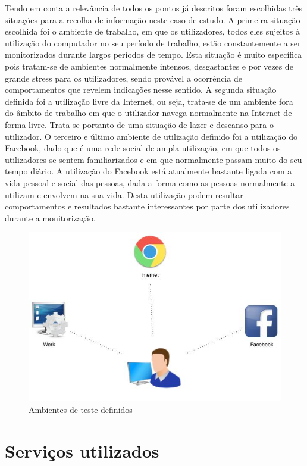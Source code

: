 Tendo em conta a relevância de todos os pontos já descritos foram escolhidas três situações para a recolha de informação neste caso de estudo. A primeira situação escolhida foi o ambiente de trabalho, em que os utilizadores, todos eles sujeitos à utilização do computador no seu período de trabalho, estão constantemente a ser monitorizados durante largos períodos de tempo. Esta situação é muito específica pois tratam-se de ambientes normalmente intensos, desgastantes e por vezes de grande stress para os utilizadores, sendo provável a ocorrência de comportamentos que revelem indicações nesse sentido. A segunda situação definida foi a utilização livre da Internet, ou seja, trata-se de um ambiente fora do âmbito de trabalho em que o utilizador navega normalmente na Internet de forma livre. Trata-se portanto de uma situação de lazer e descanso para o utilizador. O terceiro e último ambiente de utilização definido foi a utilização do Facebook, dado que é uma rede social de ampla utilização, em que todos os utilizadores se sentem familiarizados e em que normalmente passam muito do seu tempo diário. A utilização do Facebook está atualmente bastante ligada com a vida pessoal e social das pessoas, dada a forma como as pessoas normalmente a utilizam e envolvem na sua vida. Desta utilização podem resultar comportamentos e resultados bastante interessantes por parte dos utilizadores durante a monitorização.

\begin{figure}[htb]
   \centering
   \includegraphics[scale=0.5]{Images/ambientesestudo.jpg}
   \caption{Ambientes de teste definidos}
\end{figure}

\section{Serviços utilizados}

